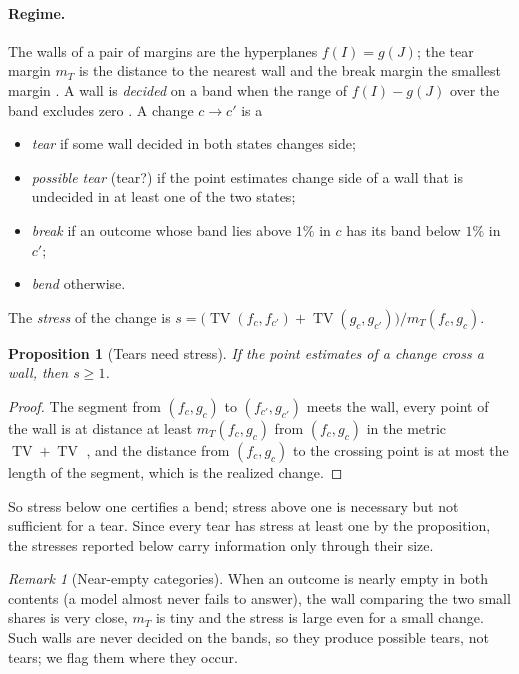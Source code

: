 \documentclass[11pt]{article}
\newtheorem{proposition}[theorem]{Proposition}
\theoremstyle{definition}
\theoremstyle{remark}
\newtheorem{remark}[theorem]{Remark}
\newcommand{\TV}{\operatorname{TV}}
\begin{document}
\paragraph{Regime.} The walls of a pair of margins are the hyperplanes $f(I)=g(J)$; the tear margin $m_T$ is the distance to the
nearest wall and the break margin the smallest margin \cite[Thm.~3.2]{Bands}. A wall is \emph{decided} on a band when the range of
$f(I)-g(J)$ over the band excludes zero \cite[Prop.~3.4]{Bands}. A change $c\to c'$ is a
\begin{itemize}[leftmargin=*,nosep]
\item \emph{tear} if some wall decided in both states changes side;
\item \emph{possible tear} (tear?) if the point estimates change side of a wall that is undecided in at least one of the two states;
\item \emph{break} if an outcome whose band lies above $1\%$ in $c$ has its band below $1\%$ in $c'$;
\item \emph{bend} otherwise.
\end{itemize}
The \emph{stress} of the change is $s=\bigl(\TV(f_c,f_{c'})+\TV(g_c,g_{c'})\bigr)/m_T(f_c,g_c)$.

\begin{proposition}[Tears need stress]\label{prop:stress}
If the point estimates of a change cross a wall, then $s\ge1$.
\end{proposition}
\begin{proof}
The segment from $(f_c,g_c)$ to $(f_{c'},g_{c'})$ meets the wall, every point of the wall is at distance at least $m_T(f_c,g_c)$ from
$(f_c,g_c)$ in the metric $\TV+\TV$ \cite[Thm.~3.2]{Bands}, and the distance from $(f_c,g_c)$ to the crossing point is at most the
length of the segment, which is the realized change.
\end{proof}

So stress below one certifies a bend; stress above one is necessary but not sufficient for a tear. Since every tear has stress at least
one by the proposition, the stresses reported below carry information only through their size.

\begin{remark}[Near-empty categories]\label{rem:empty}
When an outcome is nearly empty in both contents (a model almost never fails to answer), the wall comparing the two small shares is very
close, $m_T$ is tiny and the stress is large even for a small change. Such walls are never decided on the bands, so they produce possible
tears, not tears; we flag them where they occur.
\end{remark}
\end{document}
